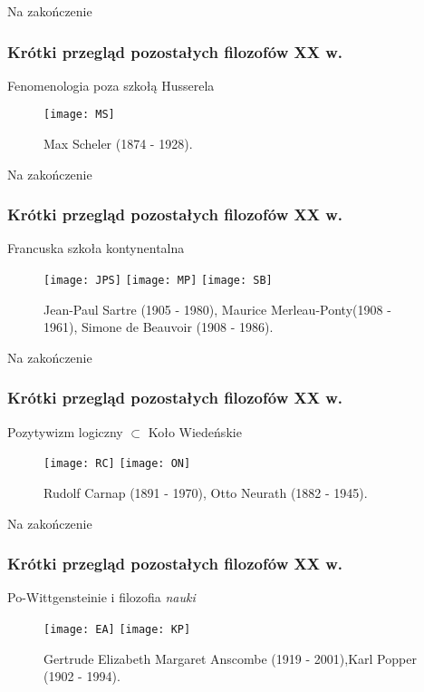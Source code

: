 \begin{frame}{Na zakończenie}
\frametitle{Krótki przegląd pozostałych filozofów XX w.}
\begin{block}{Fenomenologia poza szkołą Husserela}
\begin{figure}
\centering
\texttt{[image: MS]}
\caption{Max Scheler (1874 - 1928).}
\end{figure}
\end{block}
\end{frame}

\begin{frame}{Na zakończenie}
\frametitle{Krótki przegląd pozostałych filozofów XX w.}
\begin{block}{Francuska szkoła kontynentalna}
\begin{figure}
\centering
\texttt{[image: JPS]}
\texttt{[image: MP]}
\texttt{[image: SB]}
\caption{Jean-Paul Sartre (1905 - 1980), Maurice Merleau-Ponty\linebreak (1908 - 1961), Simone de Beauvoir (1908 - 1986).}
\end{figure}
\end{block}

\end{frame}

\begin{frame}{Na zakończenie}
\frametitle{Krótki przegląd pozostałych filozofów XX w.}
\begin{block}{Pozytywizm logiczny $\subset$ Koło Wiedeńskie}
\begin{figure}
\centering
\texttt{[image: RC]}
\texttt{[image: ON]}
\caption{Rudolf Carnap (1891 - 1970), Otto Neurath (1882 - 1945).}
\end{figure}
\end{block}
\end{frame}

\begin{frame}{Na zakończenie}
\frametitle{Krótki przegląd pozostałych filozofów XX w.}
\begin{block}{Po-Wittgensteinie i filozofia \emph{nauki}}
\begin{figure}
\centering
\texttt{[image: EA]}
\texttt{[image: KP]}
\caption{Gertrude Elizabeth Margaret Anscombe (1919 - 2001),\linebreak Karl Popper (1902 - 1994).}
\end{figure}
\end{block}
\end{frame}

